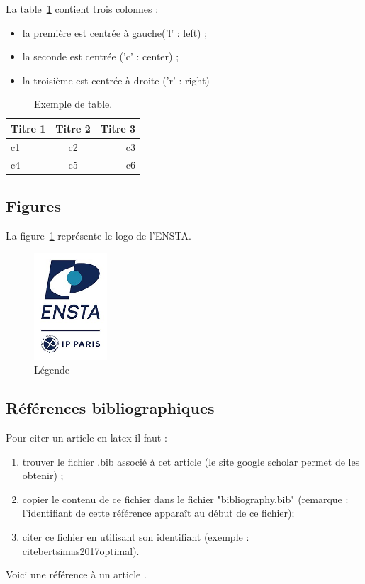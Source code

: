 \documentclass[12pt]{report}
\begin{document}
La table~\ref{tab:ex} contient trois colonnes :
\begin{itemize}
\item la première est centrée à gauche('l' : left) ;
\item la seconde est centrée ('c' : center) ;
\item la troisième est centrée à droite ('r' : right)
\end{itemize}
\begin{table}[h!]
  \centering
\begin{tabular}{lcr}
\hline %

\textbf{Titre 1} & \textbf{Titre 2} & \textbf{Titre 3} \\
\hline

c1 & c2 & c3 \\
c4 & c5 & c6\\
\hline
\end{tabular}

\caption{Exemple de table.}
\label{tab:ex}
\end{table}


\subsection{Figures}

La figure~\ref{fig:maFigure} représente le logo de l'ENSTA.

\begin{figure}[h!]
  \centering
  \includegraphics[height=4cm]{Logo_ENSTA_Paris.png}
  \caption{Légende}
  \label{fig:maFigure}
\end{figure}

\subsection{Références bibliographiques}

Pour citer un article en latex il faut :
\begin{enumerate}
\item trouver  le fichier .bib associé  à cet article (le  site google
  scholar permet de les obtenir) ;
\item   copier   le   contenu   de  ce   fichier   dans   le   fichier
  "bibliography.bib"  (remarque  :  l'identifiant de  cette  référence
  apparaît au début de ce fichier);
\item citer ce fichier en utilisant son identifiant (exemple : \\cite{bertsimas2017optimal}).
\end{enumerate}

Voici une référence à un article \cite{bertsimas2017optimal}.




\end{document}
